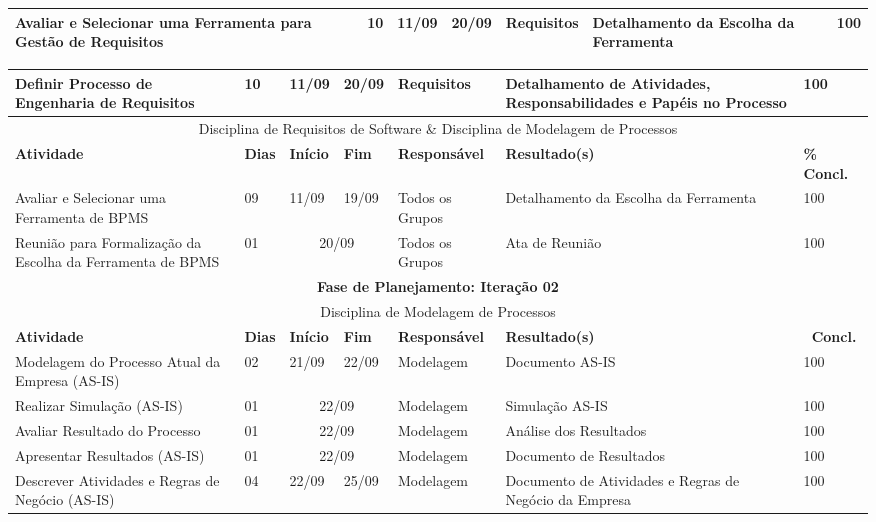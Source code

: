 \begin{landscape}
\begin{center}
\begin{tabular}{|m{6cm}|m{1cm}|m{1cm}|m{1cm}|m{4cm}|m{6cm}|m{2cm}|}
			Avaliar e Selecionar uma Ferramenta para Gestão de Requisitos & 10 & 11/09 & 20/09 & Requisitos & Detalhamento da Escolha da Ferramenta & 100 \\ \hline
			\end{tabular}
		\end{center}
		\begin{center}
			\begin{tabular}{|m{6cm}|m{1cm}|m{1cm}|m{1cm}|m{4cm}|m{6cm}|m{2cm}|}
			\hline
			Definir Processo de Engenharia de Requisitos & 10 & 11/09 & 20/09 & Requisitos & Detalhamento de Atividades, Responsabilidades e Papéis no Processo & 100 \\ \hline
			\multicolumn{7}{|c|}{Disciplina de Requisitos de Software \& Disciplina de Modelagem de Processos} \\
			\hline
			\textbf{Atividade} & \textbf{Dias} & \textbf{Início} & \textbf{Fim} & \textbf{Responsável} & \textbf{Resultado(s)} & \textbf{\% Concl.} \\ \hline
			Avaliar e Selecionar uma Ferramenta de BPMS & 09 & 11/09 & 19/09 & Todos os Grupos & Detalhamento da Escolha da Ferramenta & 100 \\ \hline
			Reunião para Formalização da Escolha da Ferramenta de BPMS & 01 & \multicolumn{2}{c|}{20/09} & Todos os Grupos & Ata de Reunião & 100 \\ \hline
			\multicolumn{7}{|c|}{\textbf{Fase de Planejamento: Iteração 02}} \\
			\hline
			\multicolumn{7}{|c|}{Disciplina de Modelagem de Processos} \\
			\hline
			\textbf{Atividade} & \textbf{Dias} & \textbf{Início} & \textbf{Fim} & \textbf{Responsável} & \textbf{Resultado(s)} & \textbf{\ Concl.} \\ \hline
			Modelagem do Processo Atual da Empresa (AS-IS) & 02 & 21/09 & 22/09 & Modelagem & Documento AS-IS & 100 \\ \hline
			Realizar Simulação (AS-IS) & 01 & \multicolumn{2}{c|}{22/09} & Modelagem & Simulação AS-IS & 100 \\ \hline
			Avaliar Resultado do Processo & 01 & \multicolumn{2}{c|}{22/09} & Modelagem & Análise dos Resultados & 100 \\ \hline
			Apresentar Resultados (AS-IS) & 01 & \multicolumn{2}{c|}{22/09} & Modelagem & Documento de Resultados & 100 \\ \hline
			Descrever Atividades e Regras de Negócio (AS-IS) & 04 & 22/09 & 25/09 & Modelagem & Documento de Atividades e Regras de Negócio da Empresa & 100 \\ \hline

\end{tabular}
\end{center}
\end{landscape}
